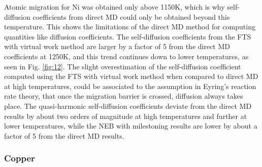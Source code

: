 \documentclass{article}
\begin{document}
Atomic migration for Ni was obtained only above 1150K, which is why self-diffusion coefficients from direct MD could only be obtained beyond this temperature. This shows the limitations of the direct MD method for computing quantities like diffusion coefficients. The self-diffusion coefficients from the FTS with virtual work method are larger by a factor of 5 from the direct MD coefficients at 1250K, and this trend continues down to lower temperatures, as seen in Fig. \ref{fig:12}. The slight overestimation of the self-diffusion coefficient computed using the FTS with virtual work method when compared to direct MD at high temperatures, could be associated to the assumption in Eyring's reaction rate theory, that once the migration barrier is crossed, diffusion always takes place. The quasi-harmonic self-diffusion coefficients deviate from the direct MD results by about two orders of magnitude at high temperatures and further at lower temperatures, while the NEB with milestoning results are lower by about a factor of 5 from the direct MD results.

\subsubsection{Copper}
\end{document}
